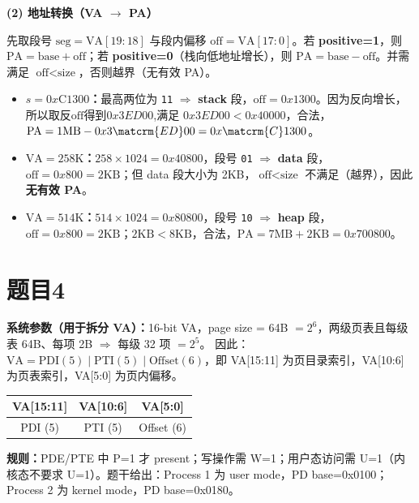 \documentclass[fleqn]{ctexart}
\begin{document}
\noindent\textbf{(2) 地址转换（VA $\rightarrow$ PA）}

\noindent 先取段号 $\text{seg}=\text{VA}[19:18]$ 与段内偏移 $\text{off}=\text{VA}[17:0]$。若 \textbf{positive=1}，则 $\text{PA}=\text{base}+\text{off}$；若 \textbf{positive=0}（栈向低地址增长），则 $\text{PA}=\text{base}-\text{off}$。并需满足 $\text{off}<\text{size}$，否则越界（无有效 PA）。

\begin{itemize}[leftmargin=2em]
\item \textbf{$s=0x\mathrm{C}1300$：}最高两位为 \texttt{11} $\Rightarrow$ \textbf{stack} 段，$\text{off}=0x1300$。因为反向增长，所以取反$\text{off}$得到$0x3ED00$,满足 $0x3ED00<0x40000$，合法，$\text{PA}=1\text{MB}-0x3\matcrm{ED}00=0x\matcrm{C}1300$。
\item \textbf{$\text{VA}=258\text{K}$：}$258\times1024=0x40800$，段号 \texttt{01} $\Rightarrow$ \textbf{data} 段，$\text{off}=0x800=2\text{KB}$；但 data 段大小为 2KB，$\text{off}<\text{size}$ 不满足（越界），因此 \textbf{无有效 PA}。
\item \textbf{$\text{VA}=514\text{K}$：}$514\times1024=0x80800$，段号 \texttt{10} $\Rightarrow$ \textbf{heap} 段，$\text{off}=0x800=2\text{KB}$；$2\text{KB}<8\text{KB}$，合法，$\text{PA}=7\text{MB}+2\text{KB}=0x700800$。
\end{itemize}

\section*{题目4}

\noindent\textbf{系统参数（用于拆分 VA）：}16-bit VA，page size = 64B $=2^6$，两级页表且每级表 64B、每项 2B $\Rightarrow$ 每级 32 项 $=2^5$。
因此：$\text{VA} = \text{PDI}(5) \;|\; \text{PTI}(5) \;|\; \text{Offset}(6)$，即 VA[15:11] 为页目录索引，VA[10:6] 为页表索引，VA[5:0] 为页内偏移。

\vspace{1mm}
\begin{center}
\begin{tabular}{|c|c|c|}
\hline
\textbf{VA[15:11]} & \textbf{VA[10:6]} & \textbf{VA[5:0]} \\
\hline
PDI (5) & PTI (5) & Offset (6) \\
\hline
\end{tabular}
\end{center}

\noindent\textbf{规则：}PDE/PTE 中 P=1 才 present；写操作需 W=1；用户态访问需 U=1（内核态不要求 U=1）。题干给出：Process 1 为 user mode，PD base=0x0100；Process 2 为 kernel mode，PD base=0x0180。
\end{document}
